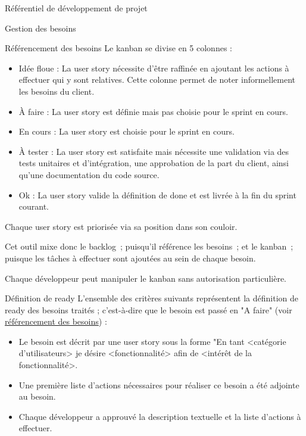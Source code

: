 \documentclass[]{article}
\begin{document}
{\begin{section}{\label{sec:Référentiel de développement de projet}Référentiel de développement de projet}
\begin{subsection}{\label{sec:Gestion des besoins}Gestion des besoins}
\begin{subsubsection}{\label{sec:Référencement des besoins}Référencement des besoins}
             Le kanban se divise en 5 colonnes :
             \begin{itemize}
                 \item Idée floue : La user story nécessite d'être raffinée en ajoutant les actions à effectuer qui y sont relatives. Cette colonne permet de noter informellement les besoins du client.
                 \item À faire : La user story est définie mais pas choisie pour le sprint en cours.
                 \item En cours : La user story est choisie pour le sprint en cours.
                 \item À tester : La user story est satisfaite mais nécessite une validation via des tests unitaires et d’intégration, une approbation de la part du client, ainsi qu’une documentation du code source.
                 \item Ok : La user story valide la définition de done et est livrée à la fin du sprint courant.
             \end{itemize}

             Chaque user story est priorisée via sa position dans son couloir.

             Cet outil mixe donc le backlog ; puisqu’il référence les besoins ; et le kanban ; puisque les tâches à effectuer sont ajoutées au sein de chaque besoin.

             Chaque développeur peut manipuler le kanban sans autorisation particulière.
         \end{subsubsection}

         \begin{subsubsection}{\label{sec:Définition de ready}Définition de ready}
            L'ensemble des critères suivants représentent la définition de ready des besoins traités ; c'est-à-dire que le besoin est passé en "A faire" (voir \hyperref[sec:Référencement des besoins]{référencement des besoins}) : 
            \begin{itemize}
                \item Le besoin est décrit par une user story sous la forme "En tant <catégorie d'utilisateurs> je désire <fonctionnalité> afin de <intérêt de la fonctionnalité>.
                \item Une première liste d'actions nécessaires pour réaliser ce besoin a été adjointe au besoin.
                \item Chaque développeur a approuvé la description textuelle et la liste d'actions à effectuer.
            \end{itemize}
        \end{subsubsection}


\end{subsection}
\end{section}}
\end{document}
